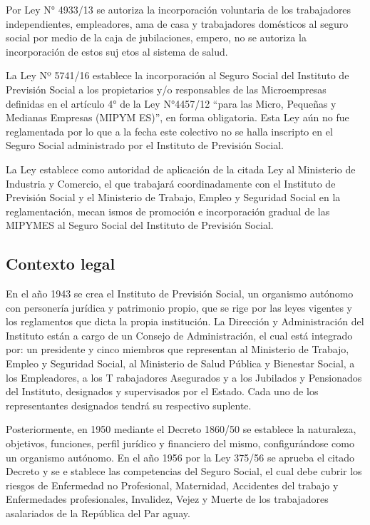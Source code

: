 Por Ley N° 4933/13 se autoriza la incorporación voluntaria de los
trabajadores independientes, empleadores, ama de casa y trabajadores
domésticos al seguro social por medio de la caja de jubilaciones,
empero, no se autoriza la incorporación de estos suj etos al sistema de
salud.

La Ley Nº 5741/16 establece la incorporación al Seguro Social del
Instituto de Previsión Social a los propietarios y/o responsables de las
Microempresas definidas en el artículo 4° de la Ley N°4457/12 ``para las
Micro, Pequeñas y Medianas Empresas (MIPYM ES)'', en forma obligatoria.
Esta Ley aún no fue reglamentada por lo que a la fecha este colectivo no
se halla inscripto en el Seguro Social administrado por el Instituto de
Previsión Social.

La Ley establece como autoridad de aplicación de la citada Ley al
Ministerio de Industria y Comercio, el que trabajará coordinadamente con
el Instituto de Previsión Social y el Ministerio de Trabajo, Empleo y
Seguridad Social en la reglamentación, mecan ismos de promoción e
incorporación gradual de las MIPYMES al Seguro Social del Instituto de
Previsión Social.

\subsection{Contexto legal}

En el año 1943 se crea el Instituto de Previsión Social, un organismo
autónomo con personería jurídica y patrimonio propio, que se rige por
las leyes vigentes y los reglamentos que dicta la propia institución. La
Dirección y Administración del Instituto están a cargo de un Consejo de
Administración, el cual está integrado por: un presidente y cinco
miembros que representan al Ministerio de Trabajo, Empleo y Seguridad
Social, al Ministerio de Salud Pública y Bienestar Social, a los
Empleadores, a los T rabajadores Asegurados y a los Jubilados y
Pensionados del Instituto, designados y supervisados por el Estado. Cada
uno de los representantes designados tendrá su respectivo suplente.

Posteriormente, en 1950 mediante el Decreto 1860/50 se establece la
naturaleza, objetivos, funciones, perfil jurídico y financiero del
mismo, configurándose como un organismo autónomo. En el año 1956 por la
Ley 375/56 se aprueba el citado Decreto y se e stablece las competencias
del Seguro Social, el cual debe cubrir los riesgos de Enfermedad no
Profesional, Maternidad, Accidentes del trabajo y Enfermedades
profesionales, Invalidez, Vejez y Muerte de los trabajadores asalariados
de la República del Par aguay.

